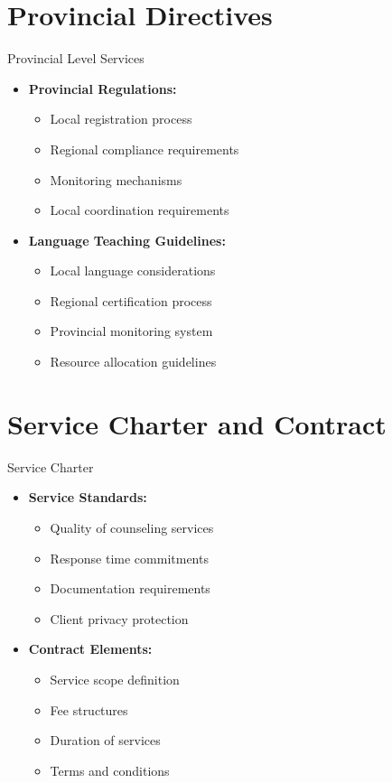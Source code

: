 \documentclass{beamer}
\begin{document}
\section{Provincial Directives}
\begin{frame}{Provincial Level Services}
\begin{itemize}
    \item \textbf{Provincial Regulations:}
    \begin{itemize}
        \item Local registration process
        \item Regional compliance requirements
        \item Monitoring mechanisms
        \item Local coordination requirements
    \end{itemize}
    \item \textbf{Language Teaching Guidelines:}
    \begin{itemize}
        \item Local language considerations
        \item Regional certification process
        \item Provincial monitoring system
        \item Resource allocation guidelines
    \end{itemize}
\end{itemize}
\end{frame}

\section{Service Charter and Contract}
\begin{frame}{Service Charter}
\begin{itemize}
    \item \textbf{Service Standards:}
    \begin{itemize}
        \item Quality of counseling services
        \item Response time commitments
        \item Documentation requirements
        \item Client privacy protection
    \end{itemize}
    \item \textbf{Contract Elements:}
    \begin{itemize}
        \item Service scope definition
        \item Fee structures
        \item Duration of services
        \item Terms and conditions
    \end{itemize}
\end{itemize}
\end{frame}
\end{document}
